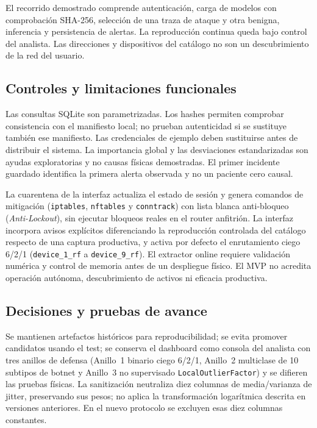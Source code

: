 \documentclass[11pt,a4paper]{article}
\begin{document}
El recorrido demostrado comprende autenticación, carga de modelos con comprobación SHA-256, selección de una traza de ataque y otra benigna, inferencia y persistencia de alertas. La reproducción continua queda bajo control del analista. Las direcciones y dispositivos del catálogo no son un descubrimiento de la red del usuario.

\subsection{Controles y limitaciones funcionales}
Las consultas SQLite son parametrizadas. Los hashes permiten comprobar consistencia con el manifiesto local; no prueban autenticidad si se sustituye también ese manifiesto. Las credenciales de ejemplo deben sustituirse antes de distribuir el sistema. La importancia global y las desviaciones estandarizadas son ayudas exploratorias y no causas físicas demostradas. El primer incidente guardado identifica la primera alerta observada y no un paciente cero causal.

La cuarentena de la interfaz actualiza el estado de sesión y genera comandos de mitigación (\texttt{iptables}, \texttt{nftables} y \texttt{conntrack}) con lista blanca anti-bloqueo (\textit{Anti-Lockout}), sin ejecutar bloqueos reales en el router anfitrión. La interfaz incorpora avisos explícitos diferenciando la reproducción controlada del catálogo respecto de una captura productiva, y activa por defecto el enrutamiento ciego 6/2/1 (\texttt{device\_1\_rf} a \texttt{device\_9\_rf}). El extractor online requiere validación numérica y control de memoria antes de un despliegue físico. El MVP no acredita operación autónoma, descubrimiento de activos ni eficacia productiva.

\subsection{Decisiones y pruebas de avance}
Se mantienen artefactos históricos para reproducibilidad; se evita promover candidatos usando el test; se conserva el dashboard como consola del analista con tres anillos de defensa (Anillo~1 binario ciego 6/2/1, Anillo~2 multiclase de 10 subtipos de botnet y Anillo~3 no supervisado \texttt{LocalOutlierFactor}) y se difieren las pruebas físicas. La sanitización neutraliza diez columnas de media/varianza de jitter, preservando sus pesos; no aplica la transformación logarítmica descrita en versiones anteriores. En el nuevo protocolo se excluyen esas diez columnas constantes.
\end{document}
